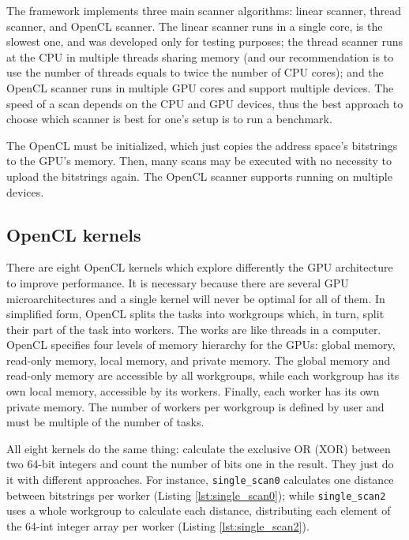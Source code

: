 The framework implements three main scanner algorithms: linear scanner, thread scanner, and OpenCL scanner. The linear scanner runs in a single core, is the slowest one, and was developed only for testing purposes; the thread scanner runs at the CPU in multiple threads sharing memory (and our recommendation is to use the number of threads equals to twice the number of CPU cores); and the OpenCL scanner runs in multiple GPU cores and support multiple devices. The speed of a scan depends on the CPU and GPU devices, thus the best approach to choose which scanner is best for one's setup is to run a benchmark.

The OpenCL must be initialized, which just copies the address space's bitstrings to the GPU's memory. Then, many scans may be executed with no necessity to upload the bitstrings again. The OpenCL scanner supports running on multiple devices.

\subsection{OpenCL kernels}

There are eight OpenCL kernels which explore differently the GPU architecture to improve performance. It is necessary because there are several GPU microarchitectures and a single kernel will never be optimal for all of them. In simplified form, OpenCL splits the tasks into workgroups which, in turn, split their part of the task into workers. The works are like threads in a computer. OpenCL specifies four levels of memory hierarchy for the GPUs: global memory, read-only memory, local memory, and private memory. The global memory and read-only memory are accessible by all workgroups, while each workgroup has its own local memory, accessible by its workers. Finally, each worker has its own private memory. The number of workers per workgroup is defined by user and must be multiple of the number of tasks.

All eight kernels do the same thing: calculate the exclusive OR (XOR) between two 64-bit integers and count the number of bits one in the result. They just do it with different approaches. For instance, \lstinline{single_scan0} calculates one distance between bitstrings per worker (Listing \ref{lst:single_scan0}); while \lstinline{single_scan2} uses a whole workgroup to calculate each distance, distributing each element of the 64-int integer array per worker (Listing \ref{lst:single_scan2}).

